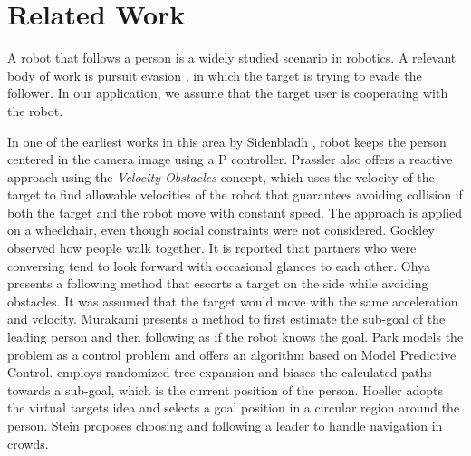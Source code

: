 \section{Related Work}
\label{sec:following_related_work}

A robot that follows a person is a widely studied scenario in robotics. A relevant body of work is pursuit evasion \cite{chung2011search}, in which the target is trying to evade the follower. In our application, we assume that the target user is cooperating with the robot.

In one of the earliest works in this area by Sidenbladh \cite{sidenbladh1999person}, robot keeps the person centered in the camera image using a P controller. Prassler \cite{prassler2001motion} also offers a reactive approach using the \textit{Velocity Obstacles} concept, which uses the velocity of the target to find allowable velocities of the robot that guarantees avoiding collision if both the target and the robot move with constant speed. The approach is applied on a wheelchair, even though social constraints were not considered. Gockley \cite{gockley2007developing} observed how people walk together. It is reported that partners who were conversing tend to look forward with occasional glances to each other. Ohya \cite{ohya2002intelligent} presents a following method that escorts a target on the side while avoiding obstacles. It was assumed that the target would move with the same acceleration and velocity. Murakami \cite{murakami2014destination} presents a method to first estimate the sub-goal of the leading person and then following as if the robot knows the goal. Park \cite{park2013autonomous} models the problem as a control problem and offers an algorithm based on Model Predictive Control.
\cite{miura2010development} employs randomized tree expansion and biases the calculated paths towards a sub-goal, which is the current position of the person. Hoeller \cite{hoeller2007accompanying} adopts the virtual targets idea and selects a goal position in a circular region around the person. Stein \cite{stein2013navigating} proposes choosing and following a leader to handle navigation in crowds.

